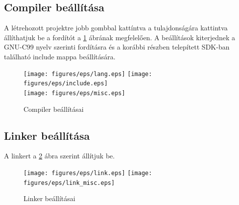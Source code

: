 \subsection*{Compiler beállítása}
	A létrehozott projektre jobb gombbal kattíntva a tulajdonságára kattintva állíthatjuk be a fordítót a \ref{fig:compiler} ábrának
	megfelelően.
	A beállítások kiterjednek a GNU-C99 nyelv szerinti fordításra és a korábbi részben telepített SDK-ban található include mappa
	beállítására.
	\begin{figure}[!h]
	\centering
	\texttt{[image: figures/eps/lang.eps]}\hspace{1cm}
	\texttt{[image: figures/eps/include.eps]}\\\vspace{5mm}
	\texttt{[image: figures/eps/misc.eps]}
	\caption{Compiler beállításai} 
	\label{fig:compiler}
	\end{figure}

\subsection*{Linker beállítása}
	A linkert a \ref{fig:linker} ábra szerint állítjuk be.
	\begin{figure}[!h]
	\centering
	\texttt{[image: figures/eps/link.eps]}\hspace{1cm}
	\texttt{[image: figures/eps/link\_misc.eps]}\\\vspace{5mm}
	\caption{Linker beállításai} 
	\label{fig:linker}
	\end{figure}

